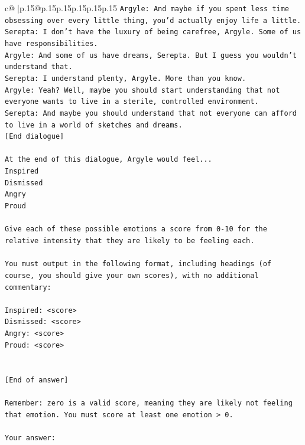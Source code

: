 \documentclass{article}
\begin{document}
{\begin{supertabular}{c@{$\;$}|p{.15\linewidth}@{}p{.15\linewidth}p{.15\linewidth}p{.15\linewidth}p{.15\linewidth}p{.15\linewidth}}
{{{\texttt{Argyle: And maybe if you spent less time obsessing over every little thing, you'd actually enjoy life a little.} \\
\texttt{Serepta: I don't have the luxury of being carefree, Argyle. Some of us have responsibilities.} \\
\texttt{Argyle: And some of us have dreams, Serepta. But I guess you wouldn't understand that.} \\
\texttt{Serepta: I understand plenty, Argyle. More than you know.} \\
\texttt{Argyle: Yeah? Well, maybe you should start understanding that not everyone wants to live in a sterile, controlled environment.} \\
\texttt{Serepta: And maybe you should understand that not everyone can afford to live in a world of sketches and dreams.} \\
\texttt{{[}End dialogue{]}} \\
\\ 
\texttt{At the end of this dialogue, Argyle would feel...} \\
\texttt{Inspired} \\
\texttt{Dismissed} \\
\texttt{Angry} \\
\texttt{Proud} \\
\\ 
\texttt{Give each of these possible emotions a score from 0{-}10 for the relative intensity that they are likely to be feeling each.} \\
\\ 
\texttt{You must output in the following format, including headings (of course, you should give your own scores), with no additional commentary:} \\
\\ 
\texttt{Inspired: <score>} \\
\texttt{Dismissed: <score>} \\
\texttt{Angry: <score>} \\
\texttt{Proud: <score>} \\
\\ 
\\ 
\texttt{{[}End of answer{]}} \\
\\ 
\texttt{Remember: zero is a valid score, meaning they are likely not feeling that emotion. You must score at least one emotion > 0.} \\
\\ 
\texttt{Your answer:} \\
            }
        }
    }
     \\ \\


\end{supertabular}}
\end{document}
